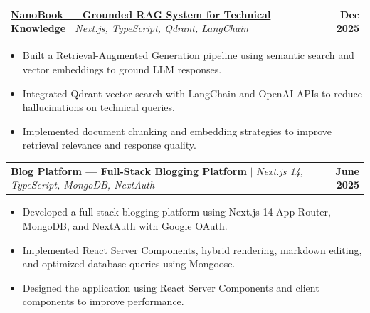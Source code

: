 \documentclass[letterpaper,11pt]{article}
\makeatletter
\newcommand{\resumeItem}[1]{
  \item\small{
    {#1 \vspace{-1pt}}
  }
}
\newcommand{\resumeProjectHeading}[2]{
    \vspace{-4pt}
    \item
    \begin{tabular*}{1.001\textwidth}{l@{\extracolsep{\fill}}r}
      \small#1 & \textbf{\small #2}\\
    \end{tabular*}\vspace{-7pt}
}
\newcommand{\resumeItemListStart}{\begin{itemize}}
\newcommand{\resumeItemListEnd}{\end{itemize}}
\makeatother
\begin{document}
  \resumeProjectHeading
      {\textbf{\href{https://github.com/IamVatsal/NanoBook}{NanoBook — Grounded RAG System for Technical Knowledge}} $|$ \emph{Next.js, TypeScript, Qdrant, LangChain}}{Dec 2025}
      \resumeItemListStart
        \resumeItem{Built a Retrieval-Augmented Generation pipeline using semantic search and vector embeddings to ground LLM responses.}
        \resumeItem{Integrated Qdrant vector search with LangChain and OpenAI APIs to reduce hallucinations on technical queries.}
        \resumeItem{Implemented document chunking and embedding strategies to improve retrieval relevance and response quality.}
      \resumeItemListEnd
      \vspace{-20pt}

    \resumeProjectHeading
      {\textbf{\href{https://github.com/IamVatsal/Blog_App_Nextjs}{Blog Platform — Full-Stack Blogging Platform}} $|$ \emph{Next.js 14, TypeScript, MongoDB, NextAuth}}{June 2025}
      \resumeItemListStart
        \resumeItem{Developed a full-stack blogging platform using Next.js 14 App Router, MongoDB, and NextAuth with Google OAuth.}
        \resumeItem{Implemented React Server Components, hybrid rendering, markdown editing, and optimized database queries using Mongoose.}
        \resumeItem{Designed the application using React Server Components and client components to improve performance.}
      \resumeItemListEnd

\end{document}
